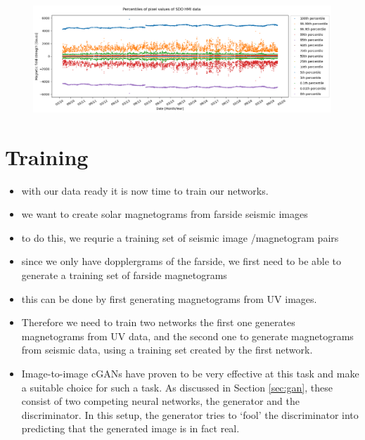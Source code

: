\documentclass[11pt,a4paper,onecolumn]{report}
\begin{document}
\begin{figure}[t]
  \centering
  \includegraphics[width=\linewidth]{HMI_percentiles.png}
  \caption{}
  \label{fig:hmi_p}
\end{figure}
























%
%
%
%
%
%
%
%
\chapter{Training}
%
%
%
%
%
%
%
%




\begin{itemize}
  \item with our data ready it is now time to train our networks.
  \item we want to create solar magnetograms from farside seismic images
  \item to do this, we requrie a training set of seismic image /magnetogram pairs
  \item since we only have dopplergrams of the farside, we first need to be able
  to generate a training set of farside magnetograms
  \item this can be done by first generating  magnetograms from UV images.
  \item Therefore we need to train two networks the first one generates
  magnetograms from UV data, and the second one to generate magnetograms from
  seismic data, using a training set created by the first network.

  \item Image-to-image cGANs have proven to be very effective at this task and
  make a suitable choice for such a task. As discussed in Section \ref{sec:gan},
  these consist of two competing neural networks, the generator and the
  discriminator. In this setup, the generator tries to `fool' the discriminator into
  predicting that the generated image is in fact real.



\end{itemize}
\end{document}
